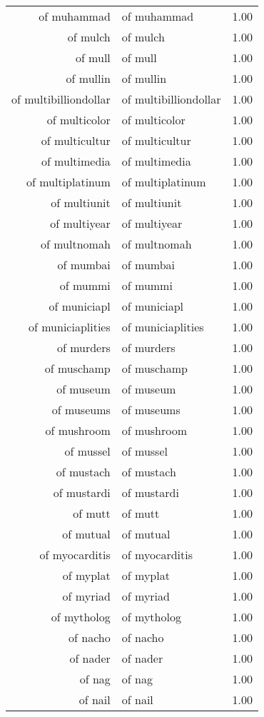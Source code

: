 \begin{table}[ht]
\begin{tabular}{rlr}
  of muhammad & of muhammad & 1.00 \\ 
  of mulch & of mulch & 1.00 \\ 
  of mull & of mull & 1.00 \\ 
  of mullin & of mullin & 1.00 \\ 
  of multibilliondollar & of multibilliondollar & 1.00 \\ 
  of multicolor & of multicolor & 1.00 \\ 
  of multicultur & of multicultur & 1.00 \\ 
  of multimedia & of multimedia & 1.00 \\ 
  of multiplatinum & of multiplatinum & 1.00 \\ 
  of multiunit & of multiunit & 1.00 \\ 
  of multiyear & of multiyear & 1.00 \\ 
  of multnomah & of multnomah & 1.00 \\ 
  of mumbai & of mumbai & 1.00 \\ 
  of mummi & of mummi & 1.00 \\ 
  of municiapl & of municiapl & 1.00 \\ 
  of municiaplities & of municiaplities & 1.00 \\ 
  of murders & of murders & 1.00 \\ 
  of muschamp & of muschamp & 1.00 \\ 
  of museum & of museum & 1.00 \\ 
  of museums & of museums & 1.00 \\ 
  of mushroom & of mushroom & 1.00 \\ 
  of mussel & of mussel & 1.00 \\ 
  of mustach & of mustach & 1.00 \\ 
  of mustardi & of mustardi & 1.00 \\ 
  of mutt & of mutt & 1.00 \\ 
  of mutual & of mutual & 1.00 \\ 
  of myocarditis & of myocarditis & 1.00 \\ 
  of myplat & of myplat & 1.00 \\ 
  of myriad & of myriad & 1.00 \\ 
  of mytholog & of mytholog & 1.00 \\ 
  of nacho & of nacho & 1.00 \\ 
  of nader & of nader & 1.00 \\ 
  of nag & of nag & 1.00 \\ 
  of nail & of nail & 1.00 \\ 

\end{tabular}
\end{table}
